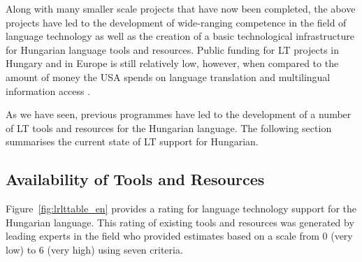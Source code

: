\begin{multicols}{2}
    Along with many smaller scale projects that have now been completed, the above projects have led to the development of wide-ranging competence in the field of language technology as well as the creation of a basic technological infrastructure for Hungarian language tools and resources. Public funding for LT projects in Hungary and in Europe is still relatively low, however, when compared to the amount of money the USA spends on language translation and multilingual information access \cite{laz1}.  

As we have seen, previous programmes have led to the development of a number of LT tools and resources for the Hungarian language. The following section summarises the current state of LT support for Hungarian.

\subsection{Availability of Tools and Resources}

Figure~\ref{fig:lrlttable_en} provides a rating for language technology support for the Hungarian language. This rating of existing tools and resources was generated by leading experts in the field who provided estimates based on a scale from 0 (very low) to 6 (very high) using seven criteria.


\end{multicols}
